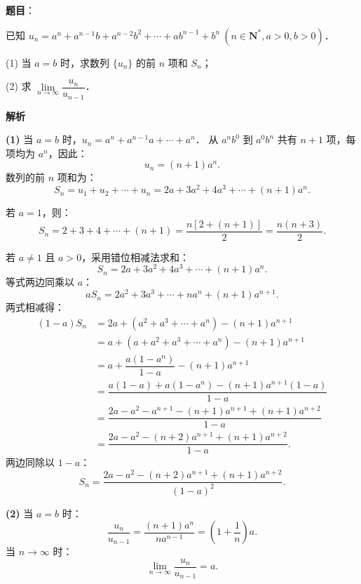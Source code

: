 \begin{answer}

\textbf{题目}：

已知 $u_n = a^n + a^{n-1}b + a^{n-2}b^2 + \cdots + ab^{n-1} + b^n\ (n \in \mathbf{N}^*, a > 0, b > 0)$．

(1) 当 $a = b$ 时，求数列 $\{u_n\}$ 的前 $n$ 项和 $S_n$；

(2) 求 $\lim\limits_{n \to \infty} \dfrac{u_n}{u_{n-1}}$．

\textbf{解析}

\textbf{(1)}
当 $a = b$ 时，$u_n = a^n + a^{n-1}a + \cdots + a^n$．
从 $a^n b^0$ 到 $a^0 b^n$ 共有 $n+1$ 项，每项均为 $a^n$，因此：
\nopagebreak[4]
\[
u_n = (n + 1) a^n.
\]
数列的前 $n$ 项和为：
\nopagebreak[4]
\[
S_n = u_1 + u_2 + \cdots + u_n = 2a + 3a^2 + 4a^3 + \cdots + (n+1)a^n.
\]

若 $a = 1$，则：
\nopagebreak[4]
\[
S_n = 2 + 3 + 4 + \cdots + (n + 1) = \dfrac{n[2 + (n+1)]}{2} = \dfrac{n(n+3)}{2}.
\]

若 $a \neq 1$ 且 $a > 0$，采用错位相减法求和：
\nopagebreak[4]
\[
S_n = 2a + 3a^2 + 4a^3 + \cdots + (n+1)a^n.
\]
等式两边同乘以 $a$：
\nopagebreak[4]
\[
a S_n = 2a^2 + 3a^3 + \cdots + n a^n + (n+1)a^{n+1}.
\]
两式相减得：
\nopagebreak[4]
\[
\begin{aligned}
(1 - a)S_n &= 2a + (a^2 + a^3 + \cdots + a^n) - (n+1)a^{n+1} \\
&= a + (a + a^2 + a^3 + \cdots + a^n) - (n+1)a^{n+1} \\
&= a + \dfrac{a(1 - a^n)}{1 - a} - (n+1)a^{n+1} \\
&= \dfrac{a(1 - a) + a(1 - a^n) - (n+1)a^{n+1}(1 - a)}{1 - a} \\
&= \dfrac{2a - a^2 - a^{n+1} - (n+1)a^{n+1} + (n+1)a^{n+2}}{1 - a} \\
&= \dfrac{2a - a^2 - (n+2)a^{n+1} + (n+1)a^{n+2}}{1 - a}.
\end{aligned}
\]
两边同除以 $1 - a$：
\nopagebreak[4]
\[
S_n = \dfrac{2a - a^2 - (n+2)a^{n+1} + (n+1)a^{n+2}}{(1 - a)^2}.
\]

\textbf{(2)}
当 $a = b$ 时：
\nopagebreak[4]
\[
\dfrac{u_n}{u_{n-1}} = \dfrac{(n+1)a^n}{n a^{n-1}} = \left(1 + \dfrac{1}{n}\right) a.
\]
当 $n \to \infty$ 时：
\nopagebreak[4]
\[
\lim_{n \to \infty} \dfrac{u_n}{u_{n-1}} = a.
\]


\end{answer}
